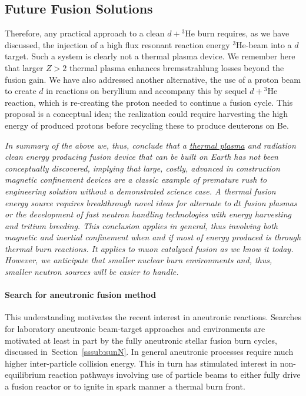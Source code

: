 \documentclass[particles,article,accept,pdftex,moreauthors]{Definitions/mdpi}
\begin{document}
\subsection{Future Fusion Solutions}
Therefore, any practical approach to a clean $d+{}^3\mathrm{He}$ burn requires, as we have discussed, the injection of a high flux resonant reaction energy ${}^3\mathrm{He}$-beam into a $d$ target. Such a system is clearly not a thermal plasma device. We remember here that larger $Z>2$ thermal plasma enhances bremsstrahlung losses beyond the fusion gain. We have also addressed another alternative, the use of a proton beam to create $d$ in reactions on beryllium and accompany this by sequel $d+{}^3\mathrm{He}$ reaction, which is re-creating the proton needed to continue a fusion cycle. This proposal is a conceptual idea; the realization could require harvesting the high energy of produced protons before recycling these to produce deuterons on Be.

{\it In summary of the above we, thus, conclude that a \underline{thermal plasma} and radiation clean energy producing fusion device that can be built on Earth has not been conceptually discovered, implying that large, costly, advanced in construction magnetic confinement devices are a classic example of premature rush to engineering solution without a demonstrated science case. A thermal fusion energy source requires breakthrough novel ideas for alternate to $dt$ fusion plasmas or the development of fast neutron handling technologies with energy harvesting and tritium breeding. This conclusion applies in general, thus involving both magnetic and inertial confinement when and if most of energy produced is through thermal burn reactions. It applies to muon catalyzed fusion as we know it today. However, we anticipate that smaller nuclear burn environments and, thus, smaller neutron sources will be easier to handle.}

\paragraph*{\bf Search for aneutronic fusion method}
This understanding motivates the recent interest in aneutronic reactions. Searches for laboratory aneutronic beam-target approaches and environments are motivated at least in part by the fully aneutronic stellar fusion burn cycles, discussed in~Section~\ref{sssub:sunN}. In general aneutronic processes require much higher inter-particle collision energy. This in turn has stimulated interest in non-equilibrium reaction pathways involving use of particle beams to either fully drive a fusion reactor or to ignite in spark manner a thermal burn front. 
\end{document}
